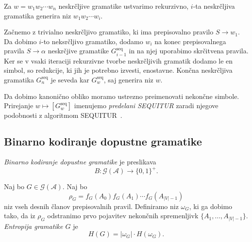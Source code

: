 \documentclass[fin1, tisk]{fmfdelo}
\providecommand{\abs}[1]{\left\lvert #1 \right\rvert}
\newcommand{\A}{\mathcal{A}}
\newcommand{\G}{\mathcal{G}}
\theoremstyle{definition}
\begin{document}
\begin{definicija}
    Za $w = w_1w_2 \cdots w_n$ neskrčljive gramatike ustvarimo rekurzivno, $i$-ta neskrčljiva
    gramatika generira niz $w_1w_2 \cdots w_i$.

    Začnemo z trivialno neskrčljivo gramatiko, ki ima prepisovalno pravilo $S \rightarrow w_1$. 
    Da dobimo $i$-to neksrčljivo gramatiko, dodamo $w_i$ na konec prepisovalnega pravila 
    $S \rightarrow \alpha$ neskrčjive gramatike $G^\text{seq}_{i-1}$ in na njej uporabimo skrčitvena
    pravila. Ker se v vsaki iteraciji rekurzivne tvorbe neskrčljivih gramatik dodamo le en simbol,
    so redukcije, ki jih je potrebno izvesti, enostavne. Končna neskrčljiva gramatika 
    $G^\text{seq}_n$ je seveda kar $G^\text{seq}_w$, saj generira niz $w$. 

    Da dobimo kanonično obliko moramo ustrezno preimenovati nekončne simbole.
    Prirejanje $w \mapsto [G^\text{seq}_w]$ imenujemo \emph{predelani SEQUITUR} zaradi njegove
    podobnosti z algoritmom SEQUITUR~\cite{NevillManningWitten1997}.
\end{definicija}

\subsection{Binarno kodiranje dopustne gramatike}

\begin{definicija}
    \emph{Binarno kodiranje dopustne gramatike} je preslikava 
    \[
        B \colon \G(\A) \to \{ 0, 1 \}^+.
    \]
\end{definicija} 

\begin{definicija}
    Naj bo $G \in \G(\A)$. Naj bo 
    \[
        \rho_G = f_G(A_0)f_G(A_1) \cdots f_G(A_{\abs{V}-1})
    \]
    niz vseh desnih članov prepisovalnih pravil. Definiramo niz $\omega_G$, ki ga dobimo tako, da
    iz $\rho_G$ odstranimo prvo pojavitev nekončnih spremenljivk $\{ A_1, \ldots, A_{\abs{V}-1} \}$.
    \emph{Entropija gramatike $G$} je 
    \[
        H(G) = \abs{\omega_G} \cdot H(\omega_G).
    \]
\end{definicija}
\end{document}
